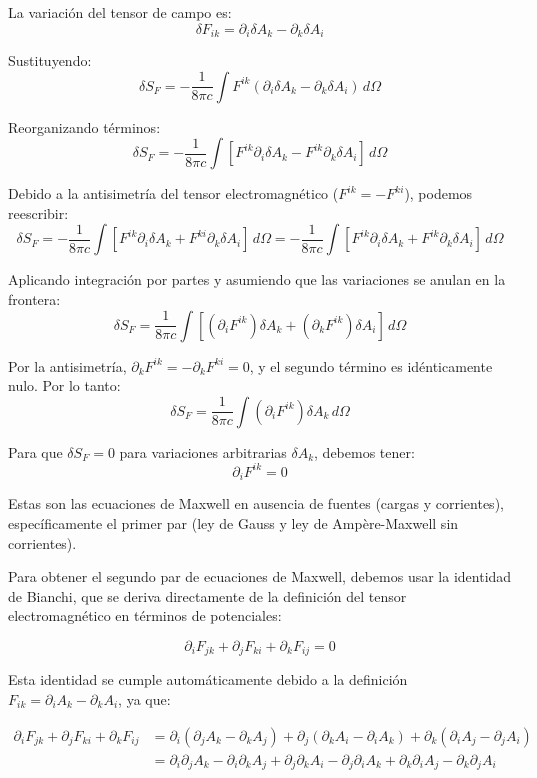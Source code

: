 \documentclass[12pt]{article}
\begin{document}
\begin{enumerate}
  La variación del tensor de campo es:
  \[
  \delta F_{ik} = \partial_i \delta A_k - \partial_k \delta A_i
  \]

  Sustituyendo:
  \[
  \delta S_F = -\frac{1}{8\pi c}\int F^{ik}(\partial_i \delta A_k - \partial_k \delta A_i)\,d\Omega
  \]

  Reorganizando términos:
  \[
  \delta S_F = -\frac{1}{8\pi c}\int [F^{ik}\partial_i \delta A_k - F^{ik}\partial_k \delta A_i]\,d\Omega
  \]

  Debido a la antisimetría del tensor electromagnético ($F^{ik} = -F^{ki}$), podemos reescribir:
  \[
  \delta S_F = -\frac{1}{8\pi c}\int [F^{ik}\partial_i \delta A_k + F^{ki}\partial_k \delta A_i]\,d\Omega = -\frac{1}{8\pi c}\int [F^{ik}\partial_i \delta A_k + F^{ik}\partial_k \delta A_i]\,d\Omega
  \]

  Aplicando integración por partes y asumiendo que las variaciones se anulan en la frontera:
  \[
  \delta S_F = \frac{1}{8\pi c}\int [(\partial_i F^{ik})\delta A_k + (\partial_k F^{ik})\delta A_i]\,d\Omega
  \]

  Por la antisimetría, $\partial_k F^{ik} = -\partial_k F^{ki} = 0$, y el segundo término es idénticamente nulo. Por lo tanto:
  \[
  \delta S_F = \frac{1}{8\pi c}\int (\partial_i F^{ik})\delta A_k\,d\Omega
  \]

  Para que $\delta S_F = 0$ para variaciones arbitrarias $\delta A_k$, debemos tener:
  \[
  \partial_i F^{ik} = 0
  \]

  Estas son las ecuaciones de Maxwell en ausencia de fuentes (cargas y corrientes), específicamente el primer par (ley de Gauss y ley de Ampère-Maxwell sin corrientes).

  Para obtener el segundo par de ecuaciones de Maxwell, debemos usar la identidad de Bianchi, que se deriva directamente de la definición del tensor electromagnético en términos de potenciales:

  \[
  \partial_i F_{jk} + \partial_j F_{ki} + \partial_k F_{ij} = 0
  \]

  Esta identidad se cumple automáticamente debido a la definición $F_{ik} = \partial_i A_k - \partial_k A_i$, ya que:

  \begin{align*}
  \partial_i F_{jk} + \partial_j F_{ki} + \partial_k F_{ij} &= \partial_i(\partial_j A_k - \partial_k A_j) + \partial_j(\partial_k A_i - \partial_i A_k) + \partial_k(\partial_i A_j - \partial_j A_i) \\
  &= \partial_i\partial_j A_k - \partial_i\partial_k A_j + \partial_j\partial_k A_i - \partial_j\partial_i A_k + \partial_k\partial_i A_j - \partial_k\partial_j A_i
  \end{align*}


\end{enumerate}
\end{document}
